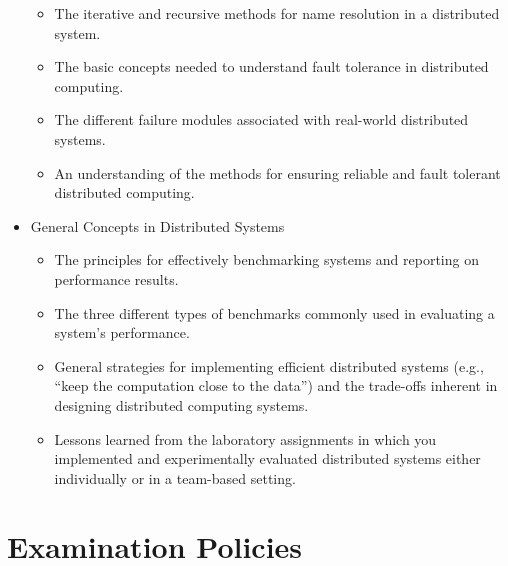 \begin{itemize}[leftmargin=0.25in]
\begin{itemize}[leftmargin=0in]
      \item The iterative and recursive methods for name resolution in a distributed system.

      \item The basic concepts needed to understand fault tolerance in distributed computing.

      \item The different failure modules associated with real-world distributed systems.

      \item An understanding of the methods for ensuring reliable and fault tolerant distributed computing.

    \end{itemize}

  \item General Concepts in Distributed Systems

    \vspace*{-.05in}
    \begin{itemize}[leftmargin=0in]

      \itemsep 0in

      \item The principles for effectively benchmarking systems and reporting on performance results.

      \item The three different types of benchmarks commonly used in evaluating a system's performance.

      \item General strategies for implementing efficient distributed systems (e.g., ``keep the computation close to the
        data'') and the trade-offs inherent in designing distributed computing systems.

      \item Lessons learned from the laboratory assignments in which you implemented and experimentally evaluated
        distributed systems either individually or in a team-based setting.


    \end{itemize}

\end{itemize}

\vspace*{-.05in}
\section*{Examination Policies}

